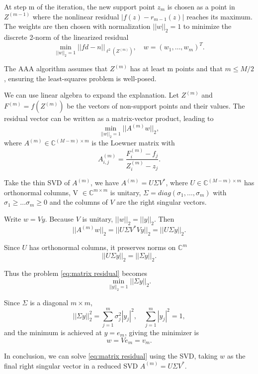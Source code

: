\documentclass[12pt,a4paper]{article}  %
\theoremstyle{definition}
\numberwithin{equation}{section}
\begin{document}
At step m of the iteration, the new support point $z_m$ is chosen as a point in $Z^{(m-1)}$ where the nonlinear residual $|f(z)-r_{m-1}(z)|$ reaches its maximum. The weights are then chosen with normalization $||w||_2=1$ to minimize the discrete 2-norm of the linearized residual
\begin{equation}
    \min\limits_{||w||_2=1} ||fd-n||_{\ell^2(Z^{(m)})}, \quad w=(w_1,\dots,w_m)^T. \label{eq:linearized residual}
\end{equation}

The AAA algorithm assumes that $Z^{(m)}$ has at least m points and that $m\le M/2$, ensuring the least-squares problem is well-posed.

We can use linear algebra to expand the explanation. Let $Z^{(m)}$ and $F^{(m)}=f(Z^{(m)})$ be the vectors of non-support points and their values. The residual vector can be written as a matrix-vector product, leading to
\begin{equation}
    \min\limits_{||w||_2=1}||A^{(m)}w||_2, \label{eq:matrix residual}
\end{equation}
where $A^{(m)}\in\mathbb{C}^{(M-m)\times m}$ is the Loewner matrix with
\[
A_{i,j}^{(m)}=\frac{F_i^{(m)}-f_j}{Z_i^{(m)}-z_j}.
\]

Take the thin SVD of $A^{(m)}$, we have $A^{(m)}=U\Sigma V^*$,
where $U\in \mathbb{C}^{(M-m)\times m}$ has orthonormal columns, V $\in\mathbb{C}^{m\times m}$ is unitary, $\Sigma=diag(\sigma_1,\dots,\sigma_m)$ with $\sigma_1\ge\dots\sigma_m\ge0$ and the columns of $V$ are the right singular vectors.

Write $w=Vy$. Because $V$ is unitary, $||w||_2=||y||_2$. Then
\[
||A^{(m)}w||_2=||U\Sigma V^*Vy||_2=||U\Sigma y||_2.
\]

Since $U$ has orthonormal columns, it preserves norms on $\mathbb{C}^m$
\[
||U\Sigma y||_2=||\Sigma y||_2.
\]

Thus the problem \eqref{eq:matrix residual} becomes
\begin{equation}
    \min\limits_{||y||_2=1}||\Sigma y||_2. \label{eq:trans}
\end{equation}

Since $\Sigma$ is a diagonal $m\times m$, 
\[
||\Sigma y||_2^2=\sum\limits_{j=1}^m\sigma_j^2|y_j|^2, \quad \sum\limits_{j=1}^m|y_j|^2=1,
\]
and the minimum is achieved at $y=e_m$, giving the minimizer is
\begin{equation}
    w=Ve_m=v_m. \label{eq:w}
\end{equation}

In conclusion, we can solve \eqref{eq:matrix residual} using the SVD, taking $w$ as the final right singular vector in a reduced SVD $A^{(m)}=U\Sigma V^*$.
\end{document}
